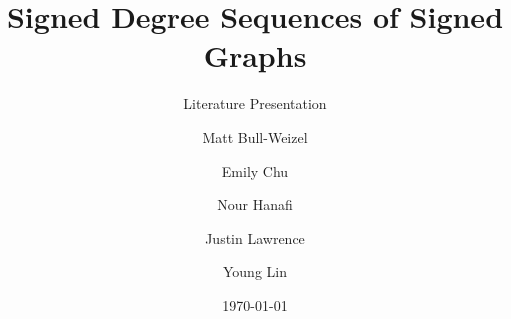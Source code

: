 \documentclass{beamer}
\title[Signed Graphs]{Signed Degree Sequences of Signed Graphs}
\subtitle{Literature Presentation}
\author[]{Matt Bull-Weizel \and Emily Chu \and Nour Hanafi \and Justin Lawrence \and Young Lin}
\institute{UBC}
\date{\today}
\begin{document}
\begin{frame}
\titlepage
\end{frame}













\end{document}
